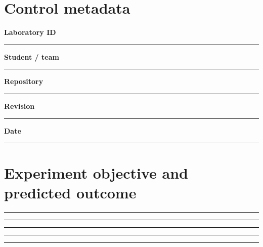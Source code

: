\documentclass[11pt,letterpaper]{article}
\begin{document}
\makedoctitle\makedocsummary
\section{Control metadata}
\noindent\textbf{Laboratory ID}\par\nobreak\vspace{6pt}\noindent\rule{0.93\linewidth}{0.4pt}\par\vspace{14pt}
\noindent\textbf{Student / team}\par\nobreak\vspace{6pt}\noindent\rule{0.93\linewidth}{0.4pt}\par\vspace{14pt}
\noindent\textbf{Repository}\par\nobreak\vspace{6pt}\noindent\rule{0.93\linewidth}{0.4pt}\par\vspace{14pt}
\noindent\textbf{Revision}\par\nobreak\vspace{6pt}\noindent\rule{0.93\linewidth}{0.4pt}\par\vspace{14pt}
\noindent\textbf{Date}\par\nobreak\vspace{6pt}\noindent\rule{0.93\linewidth}{0.4pt}\par\vspace{14pt}
\section{Experiment objective and predicted outcome}
\vspace{2mm}
\noindent\rule{0.93\linewidth}{0.4pt}\par\vspace{13pt}
\noindent\rule{0.93\linewidth}{0.4pt}\par\vspace{13pt}
\noindent\rule{0.93\linewidth}{0.4pt}\par\vspace{13pt}
\noindent\rule{0.93\linewidth}{0.4pt}\par\vspace{13pt}
\noindent\rule{0.93\linewidth}{0.4pt}\par\vspace{13pt}
\end{document}
